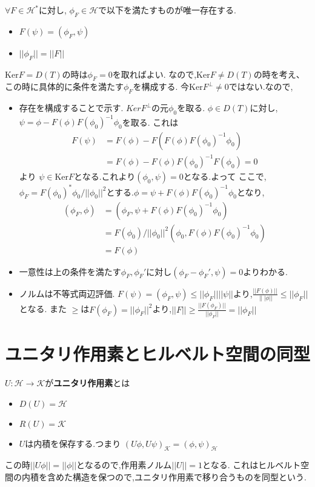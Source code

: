 \documentclass[uplatex]{jsbook}
\begin{document}
\begin{thm}[リースの表現定理]
$\forall F \in \mathcal{H}^*$に対し, $\phi_F \in \mathcal{H}$で以下を満たすものが唯一存在する.
\begin{itemize}
  \item $F(\psi) = (\phi_F, \psi)$
  \item $||\phi_F|| = ||F||$
\end{itemize}
\end{thm}
$\mathrm{Ker}F = D(T)$の時は$\phi_F= 0$を取ればよい.
なので,$\mathrm{Ker}F \neq D(T)$の時を考え、この時に具体的に条件を満たす$\phi_F$を構成する.
今$\mathrm{Ker} F^{\perp} \neq {0}$ではない.なので,
\begin{itemize}
  \item 存在を構成することで示す. $KerF^{\perp}$の元$\phi_0$を取る. $\phi \in D(T)$に対し,$\psi = \phi - F(\phi)F(\phi_0)^{-1}\phi_0 $を取る.
  これは
  \begin{align*}
  F(\psi) & =  F(\phi) - F(F(\phi) F(\phi_0)^{-1}\phi_0)  \\
          & =  F(\phi) - F(\phi)F(\phi_0)^{-1}F(\phi_0)  = 0 
  \end{align*}
  より $\psi \in \mathrm{Ker}F$となる.これより$(\phi_0, \psi) =0$となる.よって
  ここで,$\phi_F = F(\phi_0)^* \phi_0 / || \phi_0||^2$とする.$\phi = \psi + F(\phi)F(\phi_0)^{-1} \phi_0$となり,
  \begin{align*}
  (\phi_F, \phi) & = (\phi_F, \psi + F(\phi)F(\phi_0)^{-1} \phi_0)  \\
                 & = F(\phi_0) / || \phi_0||^2 (\phi_0,  F(\phi)F(\phi_0)^{-1} \phi_0) \\
                 & =  F(\phi)
  \end{align*}
 \item 一意性は上の条件を満たす$\phi_F, \phi_F'$に対し$(\phi_F - \phi_F' , \psi) = 0$よりわかる.
 \item  ノルムは不等式両辺評価.
 $F(\psi) = (\phi_F, \psi) \le ||\phi_F|| ||\psi||$より,$\frac{||F(\phi)||}{\||\phi||} \le ||\phi_F||$となる.
 また
 $\ge$は$F(\phi_F) = ||\phi_F||^2$より,$||F|| \ge \frac{||F(\phi_F)||}{||\phi_F||} = ||\phi_F||$
\end{itemize}

\section{ユニタリ作用素とヒルベルト空間の同型}

\begin{screen}
\begin{dfn}
  $U: \mathcal{H} \to \mathcal{K}$が\textbf{ユニタリ作用素}とは
\begin{itemize}
  \item $D(U) = \mathcal{H}$
  \item $R(U) = \mathcal{K}$
  \item $U$は内積を保存する.つまり
  $(U\phi, U\psi)_{\mathcal{K}} = (\phi, \psi)_{\mathcal{H}}$
\end{itemize}
\end{dfn}
\end{screen}
この時$||U\phi|| = ||\phi||$となるので,作用素ノルム$||U|| = 1$となる.
これはヒルベルト空間の内積を含めた構造を保つので,ユニタリ作用素で移り合うものを同型という.
\end{document}

